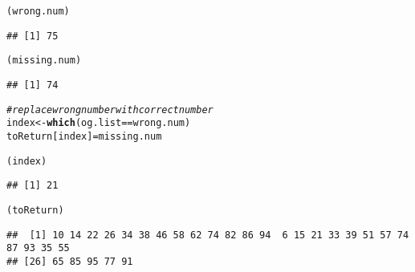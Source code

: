 \documentclass{article}\usepackage[]{graphicx}\usepackage[]{xcolor}
\makeatletter
\newcommand{\hlcom}[1]{\textcolor[rgb]{0.678,0.584,0.686}{\textit{#1}}}%
\newcommand{\hlopt}[1]{\textcolor[rgb]{0,0,0}{#1}}%
\newcommand{\hldef}[1]{\textcolor[rgb]{0.345,0.345,0.345}{#1}}%
\newcommand{\hlkwb}[1]{\textcolor[rgb]{0.69,0.353,0.396}{#1}}%
\newcommand{\hlkwd}[1]{\textcolor[rgb]{0.737,0.353,0.396}{\textbf{#1}}}%
\newenvironment{kframe}{%
 \def\at@end@of@kframe{}%
 \ifinner\ifhmode%
  \def\at@end@of@kframe{\end{minipage}}%
  \begin{minipage}{\columnwidth}%
 \fi\fi%
 \def\FrameCommand##1{\hskip\@totalleftmargin \hskip-\fboxsep
 \colorbox{shadecolor}{##1}\hskip-\fboxsep
     \hskip-\linewidth \hskip-\@totalleftmargin \hskip\columnwidth}%
 \MakeFramed {\advance\hsize-\width
   \@totalleftmargin\z@ \linewidth\hsize
   \@setminipage}}%
 {\par\unskip\endMakeFramed%
 \at@end@of@kframe}
\newenvironment{knitrout}{}{} %
\makeatother
\begin{document}
\begin{enumerate}
\begin{knitrout}
\begin{kframe}
\begin{alltt}
\hldef{(wrong.num)}
\end{alltt}
\begin{verbatim}
## [1] 75
\end{verbatim}
\begin{alltt}
\hldef{(missing.num)}
\end{alltt}
\begin{verbatim}
## [1] 74
\end{verbatim}
\begin{alltt}
\hlcom{#replace wrong number with correct number}
\hldef{index} \hlkwb{<-} \hlkwd{which}\hldef{(og.list}\hlopt{==}\hldef{wrong.num)}
\hldef{toReturn[index]} \hlkwb{=} \hldef{missing.num}

\hldef{(index)}
\end{alltt}
\begin{verbatim}
## [1] 21
\end{verbatim}
\begin{alltt}
\hldef{(toReturn)}
\end{alltt}
\begin{verbatim}
##  [1] 10 14 22 26 34 38 46 58 62 74 82 86 94  6 15 21 33 39 51 57 74 87 93 35 55
## [26] 65 85 95 77 91
\end{verbatim}
\end{kframe}
\end{knitrout}
\end{enumerate}


\end{document}
